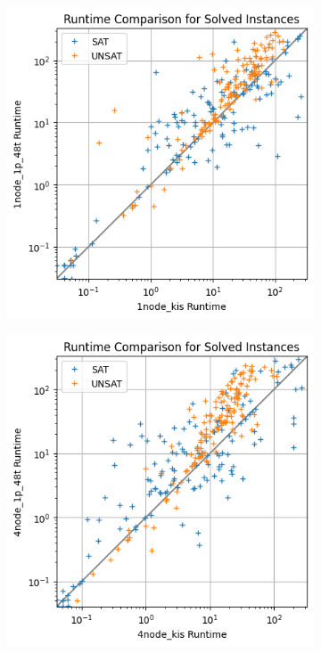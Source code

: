 \documentclass[12pt,a4paper,twoside]{scrartcl}
\numberwithin{equation}{section}
\begin{document}
\begin{figure}
  \center
  \begin{subfigure}[c]{.4\textwidth}
    \center
    \includegraphics[scale=.5]{plots/square_runtime_compare/square_runtime_1node.png}
    \label{fig:runtimeCompare1node}
  \end{subfigure}
  \begin{subfigure}[c]{.4\textwidth}
    \center
    \includegraphics[scale=.5]{plots/square_runtime_compare/square_runtime_4node.png}

\end{subfigure}
\end{figure}
\end{document}
